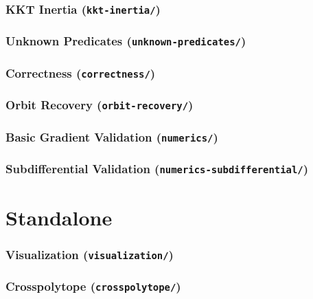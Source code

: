 \documentclass{article}
\begin{document}
\section{KKT Inertia (\texttt{kkt-inertia/})}
\graphicspath{{crates/dev-numerical-analysis/kkt-inertia/}}


\section{Unknown Predicates (\texttt{unknown-predicates/})}
\graphicspath{{crates/dev-numerical-analysis/unknown-predicates/}}


\section{Correctness (\texttt{correctness/})}
\graphicspath{{crates/dev-capacity-validation/correctness/}}


\section{Orbit Recovery (\texttt{orbit-recovery/})}
\graphicspath{{crates/dev-capacity-validation/orbit-recovery/}}


\section{Basic Gradient Validation (\texttt{numerics/})}
\graphicspath{{crates/dev-gradient/numerics/}}


\section{Subdifferential Validation (\texttt{numerics-subdifferential/})}
\graphicspath{{crates/dev-gradient/numerics-subdifferential/}}


\part{Standalone}

\section{Visualization (\texttt{visualization/})}
\graphicspath{{crates/visualization/}}


\section{Crosspolytope (\texttt{crosspolytope/})}
\graphicspath{{crates/crosspolytope/}}

\end{document}
